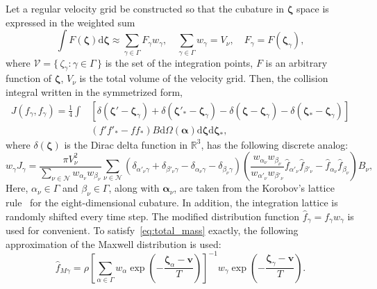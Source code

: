 \documentclass[aip,pof,preprint]{revtex4-1}
\newcommand{\dd}{\mathrm{d}}
\newcommand{\dzeta}{\boldsymbol{\dd\zeta}}
\newcommand{\bzeta}{\boldsymbol{\zeta}}
\newcommand{\Nu}{\mathcal{N}}
\newcommand{\Set}[2]{\{\,{#1}:{#2}\,\}}
\begin{document}
Let a regular velocity grid be constructed so that
the cubature in \(\bzeta\) space is expressed in the weighted sum
\begin{equation}\label{eq:zeta_cubature}
    \int F(\bzeta) \dzeta \approx \sum_{\gamma\in\Gamma} F_\gamma w_\gamma,
        \quad \sum_{\gamma\in\Gamma} w_\gamma = V_\nu,
        \quad F_\gamma = F(\bzeta_\gamma),
\end{equation}
where \(\mathcal{V} = \Set{\zeta_\gamma}{\gamma\in\Gamma}\) is the set of the integration points,
\(F\) is an arbitrary function of \(\bzeta\),
\(V_\nu\) is the total volume of the velocity grid.
Then, the collision integral written in the symmetrized form,
\begin{equation}\label{eq:symm_ci}
    \begin{aligned}
    J(f_\gamma, f_\gamma) = \frac14\int &\left[
        \delta(\bzeta'-\bzeta_\gamma) + \delta(\bzeta'_*-\bzeta_\gamma)
        - \delta(\bzeta-\bzeta_\gamma) - \delta(\bzeta_*-\bzeta_\gamma)\right] \\
        &(f'f'_* - ff_*)B \dd\Omega(\boldsymbol{\alpha}) \dzeta\dzeta_*,
    \end{aligned}
\end{equation}
where \(\delta(\bzeta)\) is the Dirac delta function in \(\mathbb{R}^3\),
has the following discrete analog:
\begin{equation}\label{eq:discrete_symm_ci}
    w_\gamma J_\gamma = \frac{\pi V_\nu^2}{\sum_{\nu\in\Nu} w_{\alpha_\nu}w_{\beta_\nu}}
        \sum_{\nu\in\Nu} \left(
            \delta_{\alpha'_\nu\gamma} + \delta_{\beta'_\nu\gamma}
            - \delta_{\alpha_\nu\gamma} - \delta_{\beta_\nu\gamma}
        \right)\left(
            \frac{w_{\alpha_\nu}w_{\beta_\nu}}{w_{\alpha'_\nu}w_{\beta'_\nu}}
            \hat{f}_{\alpha'_\nu}\hat{f}_{\beta'_\nu} - \hat{f}_{\alpha_\nu}\hat{f}_{\beta_\nu}
        \right)B_\nu,
\end{equation}
Here, \(\alpha_\nu\in\Gamma\) and \(\beta_\nu\in\Gamma\), along with \(\boldsymbol{\alpha}_\nu\),
are taken from the Korobov's lattice rule~\cite{Korobov1959, Sloan1994}
for the eight-dimensional cubature.
In addition, the integration lattice is randomly shifted every time step.
The modified distribution function \(\hat{f}_\gamma = f_\gamma w_\gamma\) is used for convenient.
To satisfy~\eqref{eq:total_mass} exactly, the following approximation of the Maxwell distribution is used:
\begin{equation}\label{eq:discrete_Maxwell}
    \hat{f}_{M\gamma} = \rho\left[\sum_{\alpha\in\Gamma}w_\alpha\exp
            \left(-\frac{\bzeta_\alpha - \boldsymbol{v}}{T}\right)
        \right]^{-1}
        w_\gamma\exp\left(-\frac{\bzeta_\gamma - \boldsymbol{v}}{T}\right).
\end{equation}
\end{document}
